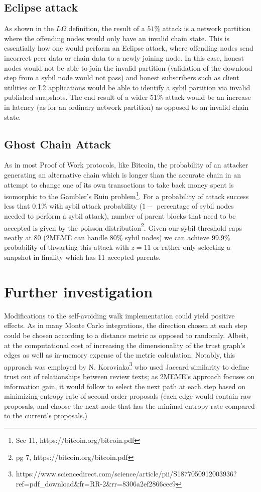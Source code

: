\documentclass{article}
\begin{document}
\subsection{Eclipse attack}
As shown in the $L\Omega$ definition, the result of a $51\%$ attack is a network partition where the offending nodes would only have an invalid chain state. This is essentially how one would perform an Eclipse attack, where offending nodes send incorrect peer data or chain data to a newly joining node. In this case, honest nodes would not be able to join the invalid partition (validation of the download step from a sybil node would not pass) and honest subscribers such as client utilities or L2 applications would be able to identify a sybil partition via invalid published snapshots. The end result of a wider $51\%$ attack would be an increase in latency (as for an ordinary network partition) as opposed to an invalid chain state.

\subsection{Ghost Chain Attack}
As in most Proof of Work protocols, like Bitcoin, the probability of an attacker generating an alternative chain which is longer than the accurate chain in an attempt to change one of its own transactions to take back money spent is isomorphic to the Gambler's Ruin problem\footnote{Sec 11, https://bitcoin.org/bitcoin.pdf}. For a probability of attack success less that 0.1\% with sybil attack probability ($1-$ percentage of sybil nodes needed to perform a sybil attack), number of parent blocks that need to be accepted is given by the poisson distribution\footnote{pg 7, https://bitcoin.org/bitcoin.pdf}. Given our sybil threshold caps neatly at 80 (2MEME can handle 80\% sybil nodes) we can achieve 99.9\% probability of thwarting this attack with $z=11$ or rather only selecting a snapshot in finality which has 11 accepted parents.

\section{Further investigation}
	Modifications to the self-avoiding walk implementation could yield positive effects. As in many Monte Carlo integrations, the direction chosen at each step could be chosen according to a distance metric as opposed to randomly. Albeit, at the computational cost of increasing the dimensionality of the trust graph’s edges as well as in-memory expense of the metric calculation. Notably, this approach was employed by N. Koroviako\footnote{https://www.sciencedirect.com/science/article/pii/S1877050912003936?ref=pdf\_download\&fr=RR-2\&rr=8306a2ef2866cee9} who used Jaccard similarity to define trust out of relationships between review texts; as 2MEME's approach focuses on information gain, it would follow to select the next path at each step based on minimizing entropy rate of second order proposals (each edge would contain raw proposals, and choose the next node that has the minimal entropy rate compared to the current’s proposals.)
	
\end{document}

